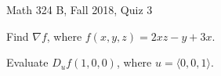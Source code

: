 \documentclass{exam}
\begin{document}
 
\begin{center} \begin{Large} Math 324 B, Fall 2018, Quiz 3\end{Large}
\end{center} 

\vspace{5mm}

\begin{center}
\end{center}

\vspace{1cm}
 

\vspace{1cm}

\begin{questions}
\question Find $\nabla f$, where $f(x,y,z) = 2xz - y + 3x.$

\vfill 

\question Evaluate $D_u f(1,0,0)$, where $u = \langle 0, 0, 1 \rangle.$ 

\vfill


\end{questions}
\end{document}
